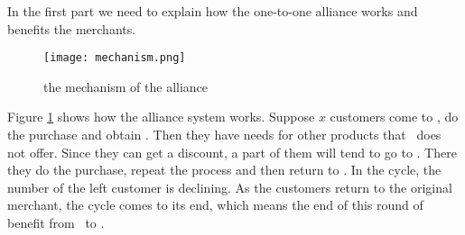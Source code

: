 In the first part we need to explain how the one-to-one alliance works and benefits the merchants.

\begin{figure}[H]
	\centering
	\texttt{[image: mechanism.png]}
	\caption{the mechanism of the alliance}
	\label{fig:mechanism}
\end{figure}

Figure \ref{fig:mechanism} shows how the alliance system works. Suppose $x$ customers come to \A, do the purchase and obtain . Then they have needs for other products that \A\ does not offer. Since they can get a discount, a part of them will tend to go to \B. There they do the purchase, repeat the process and then return to \A. In the cycle, the number of the left customer is declining. As the customers return to the original merchant, the cycle comes to its end, which means the end of this round of benefit from \A\ to \B.